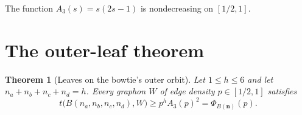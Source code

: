 \documentclass[11pt]{article}
\newtheorem{theorem}{Theorem}[section]
\begin{document}
The function $A_3(s)=s(2s-1)$ is nondecreasing on $[1/2,1]$.


\section{The outer-leaf theorem}

\begin{theorem}[Leaves on the bowtie's outer orbit]
\label{thm:main}
Let $1\leq h\leq6$ and let
$n_a+n_b+n_c+n_d=h$.  Every graphon $W$ of edge density
$p\in[1/2,1]$ satisfies
\[
 \boxed{
 t\bigl(B(n_a,n_b,n_c,n_d),W\bigr)
 \geq p^hA_3(p)^2
 =\Phi_{B(\boldsymbol n)}(p).
 }
\]
\end{theorem}
\end{document}
